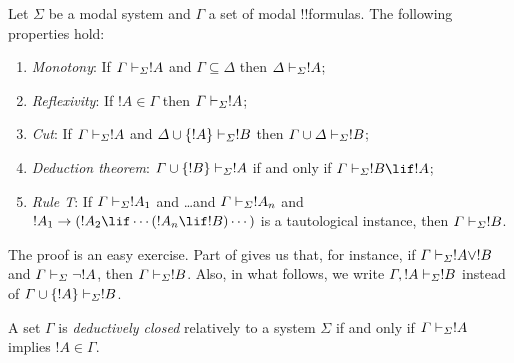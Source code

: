 \documentclass[../../../include/open-logic-section]{subfiles}
\begin{document}


\begin{prop}
  Let $\Sigma$ be a modal system and $\Gamma$ a set of modal
  !!{formula}s. The following properties hold:
  \begin{enumerate}
  \item \emph{Monotony}: If $\Gamma \Proves[\Sigma] !A$ and $\Gamma \subseteq
    \Delta$ then $\Delta \Proves[\Sigma] !A$;
  \item \emph{Reflexivity}: If $!A \in \Gamma$ then $\Gamma
    \Proves[\Sigma] !A$;
    \item \emph{Cut}: If $\Gamma \Proves[\Sigma] !A$ and $\Delta \cup
      \{!A\} \Proves[\Sigma] !B$ then $\Gamma \cup \Delta
      \Proves[\Sigma] !B$;
    \item \emph{Deduction theorem}: $\Gamma \cup \{!B\}
      \Proves[\Sigma] !A$ if and only if $\Gamma \Proves[\Sigma] !B
      \lif !A$;
    \item {}%
      \emph{Rule T}: If $\Gamma \Proves[\Sigma] !A_1$ and
      \dots and $\Gamma \Proves[\Sigma] !A_n$ and $!A_1 \to
      (!A_2 \lif \cdots (!A_n \lif !B)\cdots)$ is a
      tautological instance, then $\Gamma \Proves[\Sigma] !B$.
  \end{enumerate}
\end{prop}

The proof is an easy exercise. Part
 of 
gives us that, for instance, if $\Gamma \Proves[\Sigma] !A \lor !B$
and $\Gamma \Proves[\Sigma] \lnot !A$, then $\Gamma \Proves[\Sigma]
!B$. Also, in what follows, we write $\Gamma, !A \Proves[\Sigma] !B$
instead of $\Gamma \cup \{ !A\} \Proves[\Sigma] !B$.

\begin{defn}
  A set $\Gamma$ is \emph{deductively closed} relatively to a system
  $\Sigma$ if and only if $\Gamma \Proves[\Sigma] !A$ implies
  $!A \in \Gamma$.
\end{defn}
\end{document}
